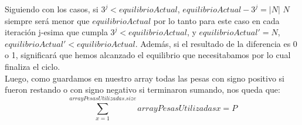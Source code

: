 Siguiendo con los casos, si ${3^j} < equilibrioActual$, $equilibrioActual - {3^j} = |N|$ $N$ siempre ser\'a menor que $equilibrioActual$ por lo tanto para este caso en cada iteraci\'on j-esima que cumpla ${3^j} < equilibrioActual$, y $equilibrioActual' = N$, $equilibrioActual' < equilibrioActual$. Adem\'as, si el resultado de la diferencia es 0 o 1, significar\'a que hemos alcanzado el equilibrio que necesitabamos por lo cual finaliza el ciclo.\\


Luego, como guardamos en nuestro array todas las pesas con signo positivo si fueron restando o con signo negativo si terminaron sumando, nos queda que:\\

\[
\sum_{x=1}^{arrayPesasUtilizadas.size}arrayPesasUtilizadas{x}= P 
\]

